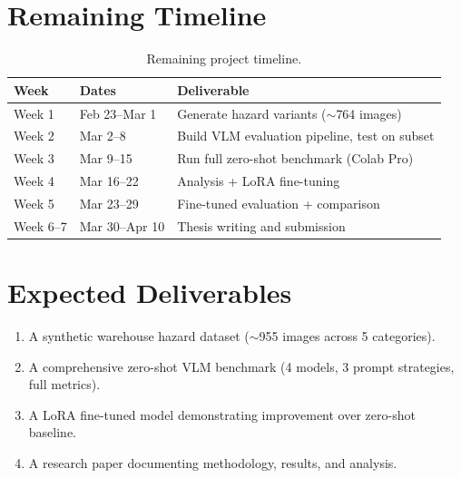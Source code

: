 \documentclass[12pt, a4paper]{article}
\begin{document}
\section{Remaining Timeline}

\begin{table}[h]
\centering
\begin{tabular}{lll}
\toprule
\textbf{Week} & \textbf{Dates} & \textbf{Deliverable} \\
\midrule
Week 1 & Feb 23--Mar 1 & Generate hazard variants ($\sim$764 images) \\
Week 2 & Mar 2--8 & Build VLM evaluation pipeline, test on subset \\
Week 3 & Mar 9--15 & Run full zero-shot benchmark (Colab Pro) \\
Week 4 & Mar 16--22 & Analysis + LoRA fine-tuning \\
Week 5 & Mar 23--29 & Fine-tuned evaluation + comparison \\
Week 6--7 & Mar 30--Apr 10 & Thesis writing and submission \\
\bottomrule
\end{tabular}
\caption{Remaining project timeline.}
\end{table}

\section{Expected Deliverables}

\begin{enumerate}
    \item A synthetic warehouse hazard dataset ($\sim$955 images across 5 categories).
    \item A comprehensive zero-shot VLM benchmark (4 models, 3 prompt strategies, full metrics).
    \item A LoRA fine-tuned model demonstrating improvement over zero-shot baseline.
    \item A research paper documenting methodology, results, and analysis.
\end{enumerate}
\end{document}
